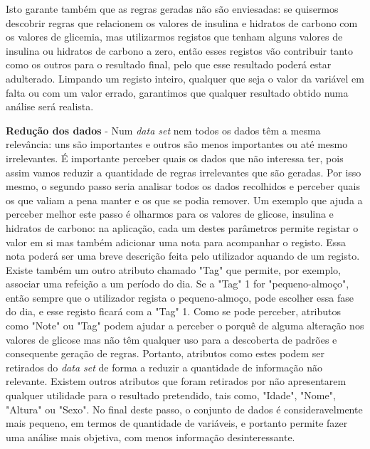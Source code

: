 Isto garante também que as regras geradas não são enviesadas: se quisermos descobrir regras que relacionem os valores de insulina e hidratos de carbono com os valores de glicemia, mas utilizarmos registos que tenham alguns valores de insulina ou hidratos de carbono a zero, então esses registos vão contribuir tanto como os outros para o resultado final, pelo que esse resultado poderá estar adulterado. Limpando um registo inteiro, qualquer que seja o valor da variável em falta ou com um valor errado, garantimos que qualquer resultado obtido numa análise será realista.


\textbf{Redução dos dados} - Num \textit{data set} nem todos os dados têm a mesma relevância: uns são importantes e outros são menos importantes ou até mesmo irrelevantes. É importante perceber quais os dados que não interessa ter, pois assim vamos reduzir a quantidade de regras irrelevantes que são geradas. Por isso mesmo, o segundo passo seria analisar todos os dados recolhidos e perceber quais os que valiam a pena manter e os que se podia remover. Um exemplo que ajuda a perceber melhor este passo é olharmos para os valores de glicose, insulina e hidratos de carbono: na aplicação, cada um destes parâmetros permite registar o valor em si mas também adicionar uma nota para acompanhar o registo. Essa nota poderá ser uma breve descrição feita pelo utilizador aquando de um registo. Existe também um outro atributo chamado "Tag" que permite, por exemplo, associar uma refeição a um período do dia. Se a "Tag" 1 for "pequeno-almoço", então sempre que o utilizador regista o pequeno-almoço, pode escolher essa fase do dia, e esse registo ficará com a "Tag" 1. Como se pode perceber, atributos como "Note" ou "Tag" podem ajudar a perceber o porquê de alguma alteração nos valores de glicose mas não têm qualquer uso para a descoberta de padrões e consequente geração de regras. Portanto, atributos como estes podem ser retirados do \textit{data set} de forma a reduzir a quantidade de informação não relevante. Existem outros atributos que foram retirados por não apresentarem qualquer utilidade para o resultado pretendido, tais como, "Idade", "Nome", "Altura" ou "Sexo". 
No final deste passo, o conjunto de dados é consideravelmente mais pequeno, em termos de quantidade de variáveis, e portanto permite fazer uma análise mais objetiva, com menos informação desinteressante.

